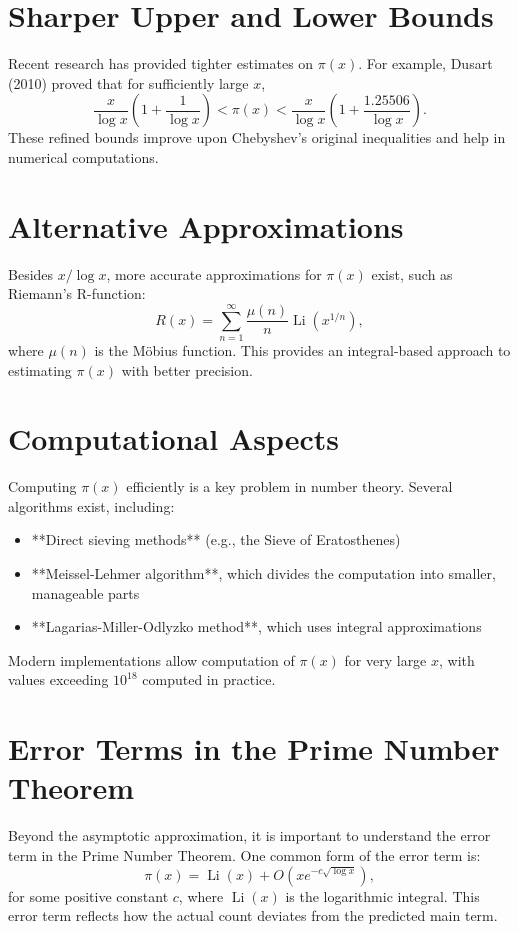 \section{Sharper Upper and Lower Bounds}
Recent research has provided tighter estimates on $\pi(x)$. For example, Dusart (2010) proved that for sufficiently large $x$,
\[
\frac{x}{\log x} \left(1 + \frac{1}{\log x}\right) < \pi(x) < \frac{x}{\log x} \left(1 + \frac{1.25506}{\log x}\right).
\]
These refined bounds improve upon Chebyshev's original inequalities and help in numerical computations.

\section{Alternative Approximations}
Besides $x/\log x$, more accurate approximations for $\pi(x)$ exist, such as Riemann’s R-function:
\[
R(x) = \sum_{n=1}^{\infty} \frac{\mu(n)}{n} \operatorname{Li}(x^{1/n}),
\]
where $\mu(n)$ is the Möbius function. This provides an integral-based approach to estimating $\pi(x)$ with better precision.

\section{Computational Aspects}
Computing $\pi(x)$ efficiently is a key problem in number theory. Several algorithms exist, including:
\begin{itemize}
    \item **Direct sieving methods** (e.g., the Sieve of Eratosthenes)
    \item **Meissel-Lehmer algorithm**, which divides the computation into smaller, manageable parts
    \item **Lagarias-Miller-Odlyzko method**, which uses integral approximations
\end{itemize}
Modern implementations allow computation of $\pi(x)$ for very large $x$, with values exceeding $10^{18}$ computed in practice.

\section{Error Terms in the Prime Number Theorem}
Beyond the asymptotic approximation, it is important to understand the error term in the Prime Number Theorem. One common form of the error term is:
\[
\pi(x) = \operatorname{Li}(x) + O\left(x e^{-c\sqrt{\log x}}\right),
\]
for some positive constant \(c\), where $\operatorname{Li}(x)$ is the logarithmic integral. This error term reflects how the actual count deviates from the predicted main term.

